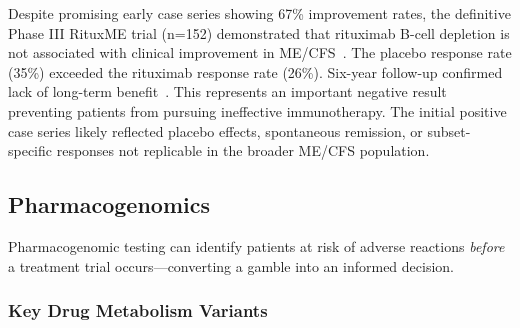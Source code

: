 \begin{warning}
\label{warn:rituximab-failure}
Despite promising early case series showing 67\% improvement rates, the definitive Phase III RituxME trial (n=152) demonstrated that rituximab B-cell depletion is not associated with clinical improvement in ME/CFS~\cite{Fluge2019}. The placebo response rate (35\%) exceeded the rituximab response rate (26\%). Six-year follow-up confirmed lack of long-term benefit~\cite{Rekeland2024}. This represents an important negative result preventing patients from pursuing ineffective immunotherapy. The initial positive case series likely reflected placebo effects, spontaneous remission, or subset-specific responses not replicable in the broader ME/CFS population.
\end{warning}

\subsection{Pharmacogenomics}
\label{sec:pharmacogenomics}

Pharmacogenomic testing can identify patients at risk of adverse reactions \textit{before} a treatment trial occurs---converting a gamble into an informed decision.

\subsubsection{Key Drug Metabolism Variants}

